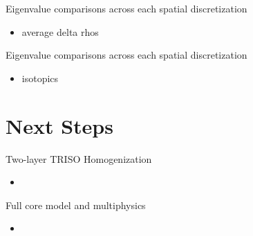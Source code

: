 \documentclass[9pt,t,aspectratio=169]{beamer}
\begin{document}
\begin{frame}{Eigenvalue comparisons across each spatial discretization}
    \begin{itemize}
        \item average delta rhos
    \end{itemize}
\end{frame}

\begin{frame}{Eigenvalue comparisons across each spatial discretization}
    \begin{itemize}
        \item isotopics
    \end{itemize}
\end{frame}

\section{Next Steps}
\begin{frame}{Two-layer TRISO Homogenization}
    \begin{itemize}
        \item
    \end{itemize}
\end{frame}

\begin{frame}{Full core model and multiphysics}
    \begin{itemize}
        \item
    \end{itemize}
\end{frame}


\end{document}
